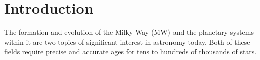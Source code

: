\section{Introduction}
\label{section:intro}


The formation and evolution of the Milky Way (MW) and the planetary systems
within it are two topics of significant interest in astronomy today.
Both of these fields require precise and accurate ages for tens to hundreds of
thousands of stars.
